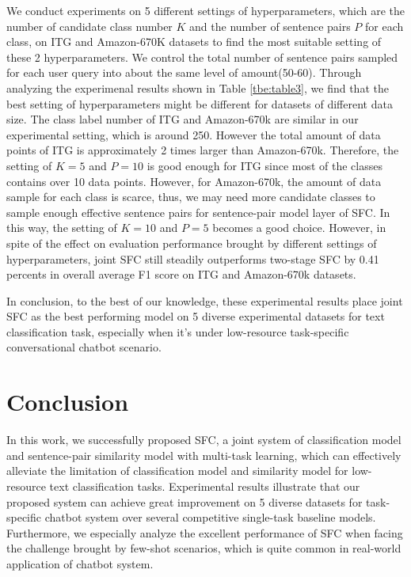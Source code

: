 \documentclass[letterpaper]{article} %
\begin{document}
  We  conduct  experiments on 5 different settings of hyperparameters, which are
  the  number of candidate class number $K$ and the number of sentence pairs $P$
  for  each  class,  on  ITG  and Amazon-670K datasets to find the most suitable
  setting  of  these  2 hyperparameters. We control the total number of sentence
  pairs  sampled for each user query into about the same level of amount(50-60).
  Through  analyzing the experimenal results shown in Table \ref{tbe:table3}, we
  find  that the best setting of hyperparameters might be different for datasets
  of  different  data  size.  The  class label number of ITG and Amazon-670k are
  similar  in  our  experimental setting, which is around 250. However the total
  amount of data points of ITG is approximately 2 times larger than Amazon-670k.
  Therefore,  the  setting of $K=5$ and $P=10$ is good enough for ITG since most
  of  the  classes  contains  over 10 data points. However, for Amazon-670k, the
  amount  of  data  sample  for  each  class  is  scarce, thus, we may need more
  candidate  classes to sample enough effective sentence pairs for sentence-pair
  model  layer  of  SFC.  In this way, the setting of $K=10$ and $P=5$ becomes a
  good choice. However, in spite of the effect on evaluation performance brought
  by different settings of hyperparameters, joint SFC still steadily outperforms
  two-stage  SFC  by  0.41  percents  in  overall  average  F1 score  on  ITG and
  Amazon-670k datasets.

  In  conclusion, to the best of our knowledge, these experimental results place
  joint  SFC as the best performing model on 5 diverse experimental datasets for
  text   classification   task,   especially   when   it's   under  low-resource
  task-specific conversational chatbot scenario.

  \section{Conclusion}
  In  this  work, we successfully proposed SFC, a joint system of classification
  model  and  sentence-pair similarity model with multi-task learning, which can
  effectively  alleviate  the  limitation of classification model and similarity
  model   for  low-resource  text  classification  tasks.  Experimental  results
  illustrate that our proposed system can achieve great improvement on 5 diverse
  datasets for task-specific chatbot system over several competitive single-task
  baseline  models. Furthermore, we especially analyze the excellent performance
  of SFC when facing the challenge brought by few-shot scenarios, which is quite
  common in real-world application of chatbot system.

  
  
\end{document}
